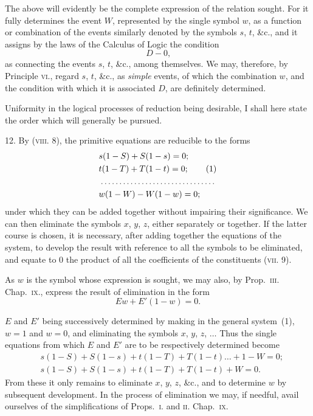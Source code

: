 \documentclass[oneside]{book}
\begin{document}
The above will evidently be the complete expression of the
relation sought. For it fully determines the event $W$,
represented by the single symbol $w$, as a function or combination of
the events similarly denoted by the symbols $s$, $t$, \&c., and it assigns
by the laws of the Calculus of Logic the condition
\[
D-0\text{,}
\]
as connecting the events $s$, $t$, \&c., among themselves. We may,
therefore, by Principle \textsc{vi.}, regard $s$, $t$, \&c., as \emph{simple} events, of
which the combination $w$, and the condition with which it is associated
$D$, are definitely determined.

Uniformity in the logical processes of reduction being desirable,
I shall here state the order which will generally be pursued.

12. By (\textsc{viii.} 8), the primitive equations are reducible to
the forms
\begin{align*}
&s(1-S) + S(1-s) = 0;\\
&t(1-T)+ T(1-t) = 0;\tag{1}\\
\multispan2\dotfill\\
&w(1-W)-W(1-w) = 0;
\end{align*}
under which they can be added together without impairing their
significance. We can then eliminate the symbols $x$, $y$, $z$, either
separately or together. If the latter course is chosen, it is necessary,
after adding together the equations of the system, to
develop the result with reference to all the symbols to be eliminated,
and equate to $0$ the product of all the coefficients of the
constituents (\textsc{vii.} 9).

As $w$ is the symbol whose expression is sought, we may also,
by Prop.~\textsc{iii.} Chap.~\textsc{ix.}, express the result of elimination in the
form
\[
Ew + E'(1-w) = 0\text{.}
\]

$E$ and $E'$ being successively determined by making in the
general system~(1), $w = 1$ and $w = 0$, and eliminating the symbols
$x$, $y$, $z$, $\dotsc$ Thus the single equations from which $E$ and $E'$ are
to be respectively determined become
\begin{align*}
&s(1-S)+S(1-s)+t(1-T) + T(1-t)\ldots+1-W=0\text{;}\\
&s(1-S)+S(1-s)+t(1-T) + T(1-t)+W=0\text{.}
\end{align*}
From these it only remains to eliminate $x$, $y$, $z$, \&c., and to determine
$w$ by subsequent development.
In the process of elimination we may, if needful, avail ourselves
of the simplifications of Props.~\textsc{i.} and \textsc{ii.} Chap.~\textsc{ix.}
\end{document}
